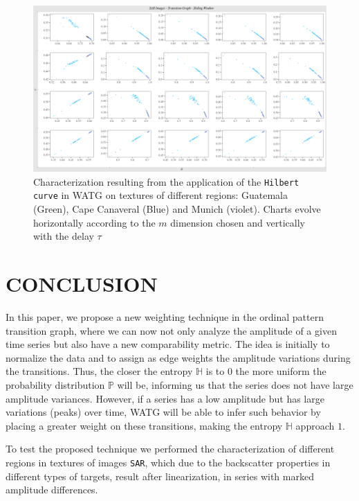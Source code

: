 \documentclass{isprs}
\begin{document}
\begin{figure}
	\centering
	\includegraphics[width=1.05\textwidth]{Figures/transitionGraphHilbert.pdf}
	\caption{Characterization resulting from the application of the \texttt{Hilbert curve} in WATG on textures of different regions: Guatemala (Green), Cape Canaveral (Blue) and Munich (violet). Charts evolve horizontally according to the $m$ dimension chosen and vertically with the delay $\tau$}
	\label{fig:Regions}
\end{figure}

	
\section{CONCLUSION}\label{Conclusion}
	
In this paper, we propose a new weighting technique in the ordinal pattern transition graph, where we can now not only analyze the amplitude of a given time series but also have a new comparability metric.
The idea is initially to normalize the data and to assign as edge weights the amplitude variations during the transitions.
Thus, the closer the entropy $\mathbb{H}$ is to $0$ the more uniform the probability distribution $\mathbb{P}$ will be, informing us that the series does not have large amplitude variances.
However, if a series has a low amplitude but has large variations (peaks) over time, WATG will be able to infer such behavior by placing a greater weight on these transitions, making the entropy $\mathbb{H}$ approach $1$.
	
To test the proposed technique we performed the characterization of different regions in textures of images \texttt{SAR}, which due to the backscatter properties in different types of targets, result after linearization, in series with marked amplitude differences.
	
\end{document}
